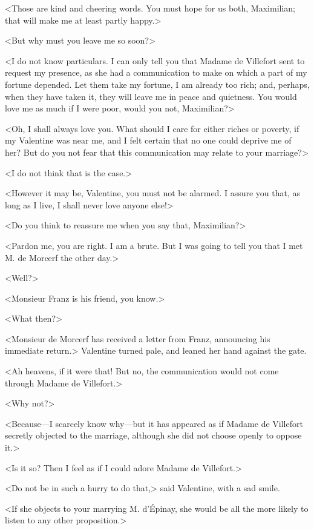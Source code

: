  <Those are kind and cheering words. You must hope for us both, Maximilian; that will make me at least partly happy.> 

 <But why must you leave me so soon?> 

 <I do not know particulars. I can only tell you that Madame de Villefort sent to request my presence, as she had a communication to make on which a part of my fortune depended. Let them take my fortune, I am already too rich; and, perhaps, when they have taken it, they will leave me in peace and quietness. You would love me as much if I were poor, would you not, Maximilian?> 

 <Oh, I shall always love you. What should I care for either riches or poverty, if my Valentine was near me, and I felt certain that no one could deprive me of her? But do you not fear that this communication may relate to your marriage?> 

 <I do not think that is the case.> 

 <However it may be, Valentine, you must not be alarmed. I assure you that, as long as I live, I shall never love anyone else!> 

 <Do you think to reassure me when you say that, Maximilian?> 

 <Pardon me, you are right. I am a brute. But I was going to tell you that I met M. de Morcerf the other day.> 

 <Well?> 

 <Monsieur Franz is his friend, you know.> 

 <What then?> 

 <Monsieur de Morcerf has received a letter from Franz, announcing his immediate return.> Valentine turned pale, and leaned her hand against the gate. 

 <Ah heavens, if it were that! But no, the communication would not come through Madame de Villefort.> 

 <Why not?> 

 <Because—I scarcely know why—but it has appeared as if Madame de Villefort secretly objected to the marriage, although she did not choose openly to oppose it.> 

 <Is it so? Then I feel as if I could adore Madame de Villefort.> 

 <Do not be in such a hurry to do that,> said Valentine, with a sad smile. 

 <If she objects to your marrying M. d'Épinay, she would be all the more likely to listen to any other proposition.> 

